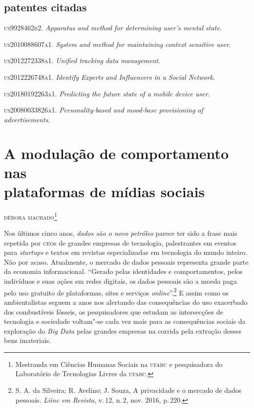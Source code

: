 \begin{bibliohedra}
\section{patentes citadas}
\tit\textsc{us9928462b2}. \textit{Apparatus and method for determining user's mental state}.

\tit\textsc{us2010088607a1}. \textit{System and method for maintaining context sensitive user}.

\tit\textsc{us2012272338a1}. \textit{Unified tracking data management}.

\tit\textsc{us2012226748a1}. \textit{Identify Experts and Influencers in a Social Network}.

\tit\textsc{us20180192263a1}. \textit{Predicting the future state of a mobile device user}.

\tit\textsc{us20080033826a1}. \textit{Personality-based and mood-base provisioning of advertisements}.
\end{bibliohedra}

\chapter[A modulação de comportamento nas plataformas de mídias sociais]{A modulação de comportamento nas\\ plataformas de mídias sociais}

\begin{flushright}
\textsc{débora machado\footnote{Mestranda em Ciências Humanas Sociais na \textsc{ufabc} e pesquisadora do Laboratório de Tecnologias Livres da \textsc{ufabc}.}}
\end{flushright}

\noindent{}Nos últimos cinco anos, \textit{dados são o novo petróleo} parece ter sido a
frase mais repetida por \textsc{ceo}s de grandes empresas de tecnologia,
palestrantes em eventos para \textit{startups} e textos em revistas
especializadas em tecnologia do mundo inteiro. Não por acaso.
Atualmente, o mercado de dados pessoais representa grande parte da
economia informacional. ``Gerado pelas identidades e comportamentos,
pelos indivíduos e suas ações em redes digitais, os dados pessoais são a
moeda paga pelo uso gratuito de plataformas, sites e serviços \textit{online}''.\footnote{S. A. da Silveira; R. Avelino; J. Souza, A privacidade e o
mercado de dados pessoais. \textit{Liinc em Revista}, v.\,12, n.\,2, nov. 2016, p.\,220.}
E assim como os ambientalistas
seguem a anos nos alertando das consequências do uso exacerbado dos
combustíveis fósseis, os pesquisadores que estudam as intersecções de
tecnologia e sociedade voltam"-se cada vez mais para as consequências
sociais da exploração do \textit{Big Data} pelas grandes empresas na corrida pela
extração desses bens imateriais.

